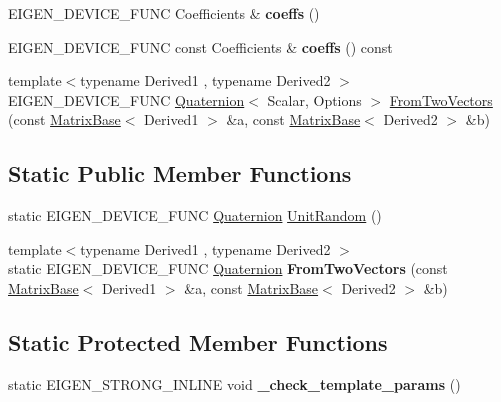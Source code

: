 \begin{DoxyCompactItemize}
\item 
\mbox{\label{class_eigen_1_1_quaternion_aa731707bceb19eae548aec3d7f3a0ac7}} 
E\+I\+G\+E\+N\+\_\+\+D\+E\+V\+I\+C\+E\+\_\+\+F\+U\+NC Coefficients \& {\bfseries coeffs} ()
\item 
\mbox{\label{class_eigen_1_1_quaternion_ae82658e23053295abf1b3f0875096b3b}} 
E\+I\+G\+E\+N\+\_\+\+D\+E\+V\+I\+C\+E\+\_\+\+F\+U\+NC const Coefficients \& {\bfseries coeffs} () const
\item 
{\footnotesize template$<$typename Derived1 , typename Derived2 $>$ }\\E\+I\+G\+E\+N\+\_\+\+D\+E\+V\+I\+C\+E\+\_\+\+F\+U\+NC \mbox{\hyperlink{class_eigen_1_1_quaternion}{Quaternion}}$<$ Scalar, Options $>$ \mbox{\hyperlink{class_eigen_1_1_quaternion_ab37b697ccf83573b0fd414e2ec543739}{From\+Two\+Vectors}} (const \mbox{\hyperlink{class_eigen_1_1_matrix_base}{Matrix\+Base}}$<$ Derived1 $>$ \&a, const \mbox{\hyperlink{class_eigen_1_1_matrix_base}{Matrix\+Base}}$<$ Derived2 $>$ \&b)
\end{DoxyCompactItemize}
\subsection*{Static Public Member Functions}
\begin{DoxyCompactItemize}
\item 
static E\+I\+G\+E\+N\+\_\+\+D\+E\+V\+I\+C\+E\+\_\+\+F\+U\+NC \mbox{\hyperlink{class_eigen_1_1_quaternion}{Quaternion}} \mbox{\hyperlink{class_eigen_1_1_quaternion_a8a61f4092bc520c7291e5b5e16e80d71}{Unit\+Random}} ()
\item 
\mbox{\label{class_eigen_1_1_quaternion_a55e431603dc1cc6e1ef5ad4b64334be8}} 
{\footnotesize template$<$typename Derived1 , typename Derived2 $>$ }\\static E\+I\+G\+E\+N\+\_\+\+D\+E\+V\+I\+C\+E\+\_\+\+F\+U\+NC \mbox{\hyperlink{class_eigen_1_1_quaternion}{Quaternion}} {\bfseries From\+Two\+Vectors} (const \mbox{\hyperlink{class_eigen_1_1_matrix_base}{Matrix\+Base}}$<$ Derived1 $>$ \&a, const \mbox{\hyperlink{class_eigen_1_1_matrix_base}{Matrix\+Base}}$<$ Derived2 $>$ \&b)
\end{DoxyCompactItemize}
\subsection*{Static Protected Member Functions}
\begin{DoxyCompactItemize}
\item 
\mbox{\label{class_eigen_1_1_quaternion_afdc86fe85ae928f117b9d328cd1594ff}} 
static E\+I\+G\+E\+N\+\_\+\+S\+T\+R\+O\+N\+G\+\_\+\+I\+N\+L\+I\+NE void {\bfseries \+\_\+check\+\_\+template\+\_\+params} ()
\end{DoxyCompactItemize}

